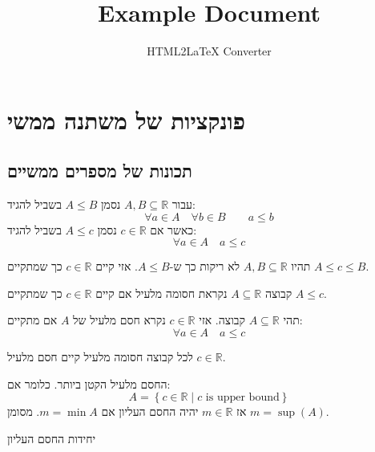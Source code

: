 \documentclass{tstextbook}
\begin{document}
\title{Example Document}
\author{HTML2LaTeX Converter}
\maketitle

\chapter{פונקציות של משתנה ממשי}

\section{תכונות של מספרים ממשיים}

\begin{symbolize}
עבור \(A, B\subseteq \mathbb{R}\) נסמן \(A\leq B\) בשביל להגיד:
$$\forall a \in A\quad \forall b \in B\qquad a\leq b$$
כאשר אם \(c \in \mathbb{R}\) נסמן \(A\leq c\) בשביל להגיד:
$$\forall a \in A\quad a\leq c$$

\end{symbolize}
\begin{definition}
תהיו \(A,B \subseteq \mathbb{R}\) לא ריקות כך ש-\(A\leq B\). אזי קיים \(c \in \mathbb{R}\) כך שמתקיים \(A\leq c \leq B\).

\end{definition}
\begin{definition}
קבוצה \(A\subseteq \mathbb{R}\) נקראת חסומה מלעיל אם קיים \(c \in \mathbb{R}\) כך שמתקיים \(A\leq c\).

\end{definition}
\begin{definition}
תהי \(A\subseteq \mathbb{R}\) קבוצה. אזי \(c \in \mathbb{R}\) נקרא חסם מלעיל של \(A\) אם מתקיים:
$$\forall a \in A\quad  a \leq c$$

\end{definition}
\begin{proposition}
לכל קבוצה חסומה מלעיל קיים חסם מלעיל \(c \in \mathbb{R}\).

\end{proposition}
\begin{definition}
החסם מלעיל הקטן ביותר. כלומר אם:
$$A=\left\{  c \in \mathbb{R}\mid c \text{ is upper bound}  \right\}$$
אז \(m \in \mathbb{R}\) יהיה החסם העליון אם \(m=\min A\). מסומן \(m=\sup(A)\).

\end{definition}
\begin{proposition}
יחידות החסם העליון

\end{proposition}
\end{document}
